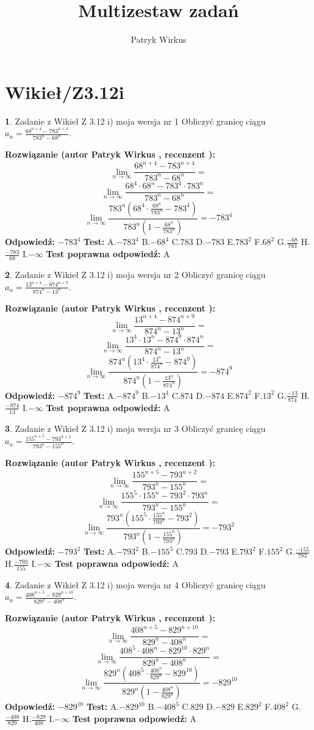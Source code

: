 \documentclass[12pt, a4paper]{article}
\title{Multizestaw zadań}
\author{Patryk Wirkus}
\date{}
\theoremstyle{definition} %
\newtheorem{zad}{}
\newcommand{\kategoria}[1]{\section{#1}}
\newcommand{\zadStart}[1]{\begin{zad}#1\newline}
\newcommand{\zadStop}{\end{zad}}
\newcommand{\rozwStart}[2]{\noindent \textbf{Rozwiązanie (autor #1 , recenzent #2): }\newline}
\newcommand{\rozwStop}{\newline}
\newcommand{\odpStart}{\noindent \textbf{Odpowiedź:}\newline}
\newcommand{\odpStop}{\newline}
\newcommand{\testStart}{\noindent \textbf{Test:}\newline}
\newcommand{\testStop}{\newline}
\newcommand{\kluczStart}{\noindent \textbf{Test poprawna odpowiedź:}\newline}
\newcommand{\kluczStop}{\newline}
\begin{document}
\maketitle

\kategoria{Wikieł/Z3.12i}


\zadStart{Zadanie z Wikieł Z 3.12 i) moja wersja nr 1}
Obliczyć granicę ciągu $a_{n}=\frac{68^{n+4} - 783^{n+4}}{783^{n}-68^{n}}$.
\zadStop
\rozwStart{Patryk Wirkus}{}
$$\lim\limits_{n\to\infty}\frac{68^{n+4} - 783^{n+4}}{783^{n}-68^{n}}=$$
$$\lim\limits_{n\to\infty}\frac{68^{4} \cdot 68^{n} - 783^{4} \cdot 783^{n}}{783^{n}-68^{n}}=$$
$$\lim\limits_{n\to\infty}\frac{783^{n}(68^{4} \cdot \frac{68^{n}}{783^{n}} - 783^{4})}{783^{n}(1-\frac{68^{n}}{783^{n}})} = -783^{4}$$
\rozwStop
\odpStart
$-783^{4}$
\odpStop
\testStart
A.$-783^{4}$
B.$-68^{4}$
C.$783$
D.$-783$
E.$783^{2}$
F.$68^{2}$
G.$\frac{-68}{783}$
H.$\frac{-783}{68}$
I.$-\infty$
\testStop
\kluczStart
A
\kluczStop



\zadStart{Zadanie z Wikieł Z 3.12 i) moja wersja nr 2}
Obliczyć granicę ciągu $a_{n}=\frac{13^{n+4} - 874^{n+9}}{874^{n}-13^{n}}$.
\zadStop
\rozwStart{Patryk Wirkus}{}
$$\lim\limits_{n\to\infty}\frac{13^{n+4} - 874^{n+9}}{874^{n}-13^{n}}=$$
$$\lim\limits_{n\to\infty}\frac{13^{4} \cdot 13^{n} - 874^{9} \cdot 874^{n}}{874^{n}-13^{n}}=$$
$$\lim\limits_{n\to\infty}\frac{874^{n}(13^{4} \cdot \frac{13^{n}}{874^{n}} - 874^{9})}{874^{n}(1-\frac{13^{n}}{874^{n}})} = -874^{9}$$
\rozwStop
\odpStart
$-874^{9}$
\odpStop
\testStart
A.$-874^{9}$
B.$-13^{4}$
C.$874$
D.$-874$
E.$874^{2}$
F.$13^{2}$
G.$\frac{-13}{874}$
H.$\frac{-874}{13}$
I.$-\infty$
\testStop
\kluczStart
A
\kluczStop



\zadStart{Zadanie z Wikieł Z 3.12 i) moja wersja nr 3}
Obliczyć granicę ciągu $a_{n}=\frac{155^{n+5} - 793^{n+2}}{793^{n}-155^{n}}$.
\zadStop
\rozwStart{Patryk Wirkus}{}
$$\lim\limits_{n\to\infty}\frac{155^{n+5} - 793^{n+2}}{793^{n}-155^{n}}=$$
$$\lim\limits_{n\to\infty}\frac{155^{5} \cdot 155^{n} - 793^{2} \cdot 793^{n}}{793^{n}-155^{n}}=$$
$$\lim\limits_{n\to\infty}\frac{793^{n}(155^{5} \cdot \frac{155^{n}}{793^{n}} - 793^{2})}{793^{n}(1-\frac{155^{n}}{793^{n}})} = -793^{2}$$
\rozwStop
\odpStart
$-793^{2}$
\odpStop
\testStart
A.$-793^{2}$
B.$-155^{5}$
C.$793$
D.$-793$
E.$793^{2}$
F.$155^{2}$
G.$\frac{-155}{793}$
H.$\frac{-793}{155}$
I.$-\infty$
\testStop
\kluczStart
A
\kluczStop



\zadStart{Zadanie z Wikieł Z 3.12 i) moja wersja nr 4}
Obliczyć granicę ciągu $a_{n}=\frac{408^{n+5} - 829^{n+10}}{829^{n}-408^{n}}$.
\zadStop
\rozwStart{Patryk Wirkus}{}
$$\lim\limits_{n\to\infty}\frac{408^{n+5} - 829^{n+10}}{829^{n}-408^{n}}=$$
$$\lim\limits_{n\to\infty}\frac{408^{5} \cdot 408^{n} - 829^{10} \cdot 829^{n}}{829^{n}-408^{n}}=$$
$$\lim\limits_{n\to\infty}\frac{829^{n}(408^{5} \cdot \frac{408^{n}}{829^{n}} - 829^{10})}{829^{n}(1-\frac{408^{n}}{829^{n}})} = -829^{10}$$
\rozwStop
\odpStart
$-829^{10}$
\odpStop
\testStart
A.$-829^{10}$
B.$-408^{5}$
C.$829$
D.$-829$
E.$829^{2}$
F.$408^{2}$
G.$\frac{-408}{829}$
H.$\frac{-829}{408}$
I.$-\infty$
\testStop
\kluczStart
A
\kluczStop
\end{document}
